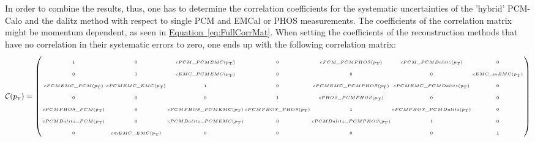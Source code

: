  In order to combine the results, thus, one has to determine the correlation coefficients for the systematic uncertainties of the 'hybrid' \acs{PCM}-\acs{Calo} and the dalitz method with respect to single \acs{PCM} and \acs{EMCal} or \acs{PHOS} measurements. The coefficients of the correlation matrix might be momentum dependent, as seen in \hyperref[eq:FullCorrMat]{Equation~\ref*{eq:FullCorrMat}}. When setting the coefficients of the reconstruction methods that have no correlation in their systematic errors to zero, one ends up with the following correlation matrix:
 			\begin{eqnarray}
 				\tiny
 				\arraycolsep=1.pt\def\arraystretch{2.5}
 				\mathcal{C}(p_{\mbox{\tiny \text{T}}}) =
 				\left( \begin{array}{ccccccc}
 				1 & 0 & cPCM\_PCMEMC(p_{\mbox{\tiny T}}) & 0 & cPCM\_PCMPHOS(p_{\mbox{\tiny T}}) & cPCM\_PCMDalitz(p_{\mbox{\tiny T}}) & 0 \\
 				0 & 1 & cEMC\_PCMEMC(p_{\mbox{\tiny T}}) & 0 & 0 & 0 & cEMC\_mEMC(p_{\mbox{\tiny T}}) \\
 				cPCMEMC\_PCM(p_{\mbox{\tiny T}}) & cPCMEMC\_EMC(p_{\mbox{\tiny T}}) & 1 & 0 & cPCMEMC\_PCMPHOS(p_{\mbox{\tiny T}}) & cPCMEMC\_PCMDalitz(p_{\mbox{\tiny T}}) & 0 \\
 				0 & 0 & 0 & 1 & cPHOS\_PCMPHOS(p_{\mbox{\tiny T}}) & 0 & 0 \\
 				cPCMPHOS\_PCM(p_{\mbox{\tiny T}}) & 0 & cPCMPHOS\_PCMEMC(p_{\mbox{\tiny T}}) & cPCMPHOS\_PHOS(p_{\mbox{\tiny T}}) & 1 & cPCMPHOS\_PCMDalitz(p_{\mbox{\tiny T}}) & 0 \\
 				cPCMDalitz\_PCM(p_{\mbox{\tiny T}}) & 0 & cPCMDalitz\_PCMEMC(p_{\mbox{\tiny T}}) & 0 & cPCMDalitz\_PCMPHOS(p_{\mbox{\tiny T}}) & 1 & 0 \\
 				0 & cmEMC\_EMC(p_{\mbox{\tiny T}}) & 0 & 0 & 0 & 0 & 1 \\
 				\end{array} \right)
 				\label{eq:FullCorrMat}
 			\end{eqnarray}

